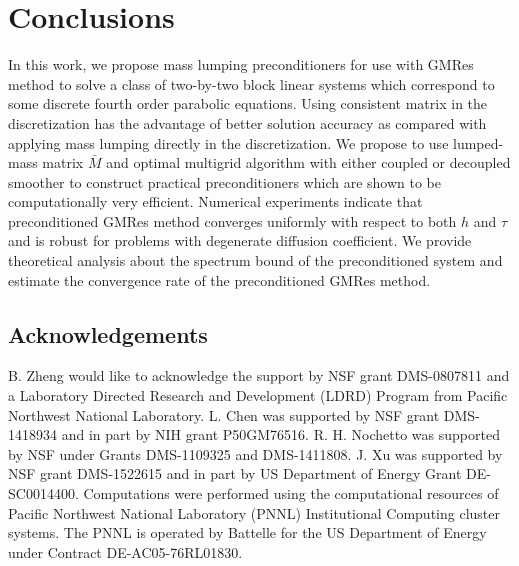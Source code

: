 \documentclass[smallcondensed]{svjour3}
\numberwithin{equation}{section} \numberwithin{table}{section}
\numberwithin{figure}{section}
\numberwithin{algorithm}{section}
\begin{document}
\section{Conclusions}
In this work, we propose mass lumping preconditioners for use with GMRes method to solve a class of two-by-two block linear systems which correspond to some discrete fourth order parabolic equations. Using consistent matrix in the discretization has the advantage of better solution accuracy as compared with applying mass lumping directly in the discretization. We propose to use lumped-mass matrix $\bar{M}$ and optimal multigrid algorithm with either coupled or decoupled smoother to construct practical preconditioners which are shown to be computationally very efficient. Numerical experiments indicate that preconditioned GMRes method converges uniformly with respect to both $h$ and $\tau$ and is robust for problems with degenerate diffusion coefficient. We provide theoretical analysis about the spectrum bound of the preconditioned system and estimate the convergence rate of the preconditioned GMRes method.

\subsection*{Acknowledgements} 
B. Zheng would like to acknowledge the support by NSF grant DMS-0807811 and a Laboratory Directed Research and Development (LDRD) Program from Pacific Northwest National Laboratory. L. Chen was supported by NSF grant DMS-1418934 and in part by NIH grant P50GM76516. R. H. Nochetto was supported by NSF under Grants DMS-1109325 and DMS-1411808. J. Xu was supported by NSF grant DMS-1522615 and in part by US Department of Energy Grant DE-SC0014400. Computations were performed using the computational resources of Pacific Northwest National Laboratory (PNNL) Institutional Computing cluster systems. The PNNL is operated by Battelle for the US Department of Energy under Contract DE-AC05-76RL01830.



\end{document}
